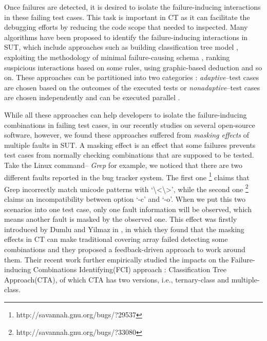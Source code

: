 \documentclass{sig-alternate}
\begin{document}
Once failures are detected, it is desired to isolate the failure-inducing interactions in these failing test cases. This task is important in CT as it can facilitate the debugging efforts by reducing the code scope that needed to inspected\cite{ghandehari2012identifying}. Many algorithms have been proposed to identify the failure-inducing interactions in SUT, which include approaches such as building classification tree model \cite{yilmaz2006covering}, exploiting the methodology of minimal failure-causing schema \cite{nie2011minimal}, ranking suspicious interactions based on some rules\cite{ghandehari2012identifying}, using graphic-based deduction \cite{martinez2008algorithms} and so on. These approaches can be partitioned into two categories \cite{colbourn2008locating}: \emph{adaptive}--test cases are chosen based on the outcomes of the executed tests \cite{nie2011minimal,ghandehari2012identifying,niu2013identifying,zhang2011characterizing,shakya2012isolating,wang2010adaptive,li2012improved}or \emph{nonadaptive}--test cases are chosen independently and can be executed parallel \cite{yilmaz2006covering,colbourn2008locating,martinez2008algorithms,martinez2009locating,fouche2009incremental}.


While all these approaches can help developers to isolate the failure-inducing combinations in failing test cases, in our recently studies on several open-source software, however, we found these approaches suffered from \emph{masking effects} of multiple faults in SUT. A masking effect \cite{dumlu2011feedback,yilmaz2013reducing} is an effect that some failures prevents test cases from normally checking combinations that are supposed to be tested. Take the Linux command-- \emph{Grep} for example, we noticed that there are two different faults reported in the bug tracker system. The first one \footnote{http://savannah.gnu.org/bugs/?29537}  claims that Grep incorrectly match unicode patterns with `\textbackslash<\textbackslash>', while the second one \footnote{http://savannah.gnu.org/bugs/?33080} claims an incompatibility between option `-c' and `-o'. When we put this two scenarios into one test case, only one fault information will be observed, which means another fault is masked by the observed one. This effect was firstly introduced by Dumlu and Yilmaz in \cite{dumlu2011feedback}, in which they found that the masking effects in CT can make traditional covering array failed detecting some combinations and they proposed a feedback-driven approach to work around them. Their recent work \cite{yilmaz2013reducing} further empirically studied the impacts on the Failure-inducing Combinations Identifying(FCI) approach :  Classification Tree Approach(CTA)\cite{yilmaz2006covering}, of which CTA has two versions, i.e., ternary-class and multiple-class.
\end{document}
